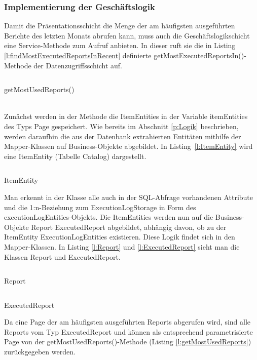 \subsubsection{Implementierung der Geschäftslogik}
\label{sec:ImplementierungGeschaeftslogik}
Damit die Präsentationsschicht die Menge der am häufigsten ausgeführten Berichte des letzten Monats abrufen kann, muss auch die Geschäftslogikschicht eine Service-Methode zum Aufruf anbieten. In dieser ruft sie die in Listing \ref{l:findMostExecutedReportsInRecent} definierte getMostExecutedReportsIn()-Methode der Datenzugriffsschicht auf.
\begin{listing}[!ht]
  \inputminted{java}{Listings/getMostUsedReports().java}
  \caption{getMostUsedReports()}
  \label{l:getMostUsedReports}
\end{listing}\\
Zunächst werden in der Methode die ItemEntities in der Variable itemEntities des Typs Page gespeichert.
Wie bereits im Abschnitt \ref{p:Logik} beschrieben, werden daraufhin die aus der Datenbank extrahierten Entitäten mithilfe der Mapper-Klassen auf Business-Objekte abgebildet. In Listing~\ref{l:ItemEntity} wird eine ItemEntity (Tabelle Catalog) dargestellt.
\begin{listing}[!ht]
  \inputminted{java}{Listings/ItemEntity.java}
  \caption{ItemEntity}
  \label{l:ItemEntity}
\end{listing}
Man erkennt in der Klasse alle auch in der SQL-Abfrage vorhandenen Attribute und die 1:n-Beziehung zum ExecutionLogStorage in Form des executionLogEntities-Objekts. Die ItemEntities werden nun auf die Business-Objekte Report \bzw ExecutedReport abgebildet, abhängig davon, ob zu der ItemEntity ExecutionLogEntities existieren. Diese Logik findet sich in den Mapper-Klassen. In Listing \ref{l:Report} und \ref{l:ExecutedReport} sieht man die Klassen Report und ExecutedReport.
\begin{listing}[!ht]
  \inputminted{java}{Listings/Report.java}
  \caption{Report}
  \label{l:Report}
\end{listing}
\begin{listing}[!ht]
  \inputminted{java}{Listings/ExecutedReport.java}
  \caption{ExecutedReport}
  \label{l:ExecutedReport}
\end{listing}
Da eine Page der am häufigsten ausgeführten Reports abgerufen wird, sind alle Reports vom Typ ExecutedReport und können als entsprechend parametrisierte Page von der get\-Most\-Used\-Reports()-Methode (Listing \ref{l:getMostUsedReports}) zurückgegeben werden.

